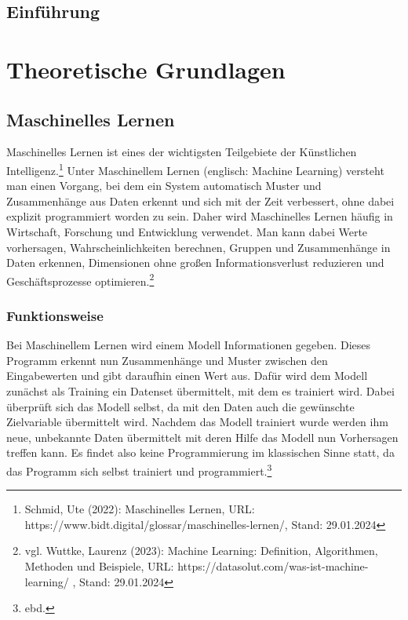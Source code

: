 \documentclass[11pt,oneside]{report}
\begin{document}


\setcounter{page}{2}
\tableofcontents

\newpage


\section{Einführung}
\blindtext


\chapter{Theoretische Grundlagen}

\section{Maschinelles Lernen}
Maschinelles Lernen ist eines der wichtigsten Teilgebiete der Künstlichen Intelligenz.\footnote{Schmid, Ute (2022): Maschinelles Lernen, URL: https://www.bidt.digital/glossar/maschinelles-lernen/, Stand: 29.01.2024} Unter Maschinellem Lernen (englisch: Machine Learning) versteht man einen Vorgang, bei dem ein System automatisch Muster und Zusammenhänge aus Daten erkennt und sich mit der Zeit verbessert, ohne dabei explizit programmiert worden zu sein. Daher wird Maschinelles Lernen häufig in Wirtschaft, Forschung und Entwicklung verwendet. Man kann dabei Werte vorhersagen, Wahrscheinlichkeiten berechnen, Gruppen und Zusammenhänge in Daten erkennen, Dimensionen ohne großen Informationsverlust reduzieren und Geschäftsprozesse optimieren.\footnote{vgl. Wuttke, Laurenz (2023): Machine Learning: Definition, Algorithmen, Methoden und Beispiele, URL: https://datasolut.com/was-ist-machine-learning/ , Stand: 29.01.2024}

\subsection{Funktionsweise}
Bei Maschinellem Lernen wird einem Modell Informationen gegeben. Dieses Programm erkennt nun Zusammenhänge und Muster zwischen den Eingabewerten und gibt daraufhin einen Wert aus. Dafür wird dem Modell zunächst als Training ein Datenset übermittelt, mit dem es trainiert wird. Dabei überprüft sich das Modell selbst, da mit den Daten auch die gewünschte Zielvariable übermittelt wird. Nachdem das Modell trainiert wurde werden ihm neue, unbekannte Daten übermittelt mit deren Hilfe das Modell nun Vorhersagen treffen kann. Es findet also keine Programmierung im klassischen Sinne statt, da das Programm sich selbst trainiert und programmiert.\footnote{ebd.}
\end{document}
